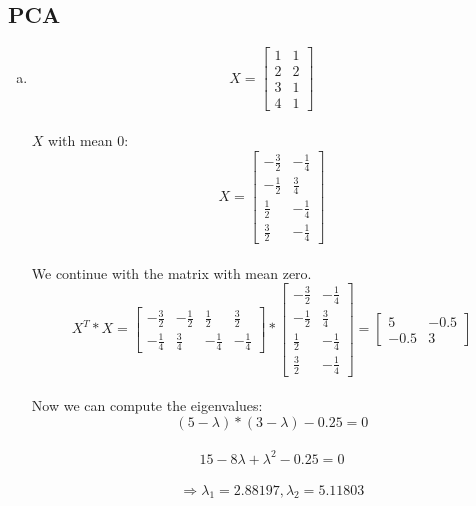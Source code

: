 \documentclass[12pt]{article}
\begin{document}

\setcounter{section}{2}

\subsection{PCA}
\begin{enumerate}[a)]
    \item 
        $$X =\begin{bmatrix} 1&1 \\ 2&2 \\ 3 & 1 \\ 4 & 1 \end{bmatrix}$$\\
        $X$ with mean $0$:\\
        $$X =\begin{bmatrix} -\frac{3}{2}& -\frac{1}{4} \\ -\frac{1}{2}&\frac{3}{4} \\ \frac{1}{2} & -\frac{1}{4} \\ \frac{3}{2} & -\frac{1}{4} \end{bmatrix}$$\\
        We continue with the matrix with mean zero.\\
        $$X^T * X = \begin{bmatrix} -\frac{3}{2}& -\frac{1}{2} & \frac{1}{2} & \frac{3}{2} \\
        				-\frac{1}{4} & \frac{3}{4} & -\frac{1}{4}  & -\frac{1}{4} \end{bmatrix} *
        				\begin{bmatrix} -\frac{3}{2}& -\frac{1}{4} \\ -\frac{1}{2}&\frac{3}{4} \\ \frac{1}{2} & -\frac{1}{4} \\ \frac{3}{2} & -\frac{1}{4} \end{bmatrix} 
        				= \begin{bmatrix}
        					5 & -0.5 \\
        					-0.5 & 3
        				\end{bmatrix}
        				$$\\
        	Now we can compute the eigenvalues:\\
        		$$ (5 - \lambda)*(3 - \lambda)-0.25 =0$$\\
        		$$ 15 - 8\lambda + \lambda^2 -0.25 = 0$$\\
        		$$ \Rightarrow \lambda_1= 2.88197, \lambda_2=5.11803 $$\\
        		

\end{enumerate}
\end{document}
